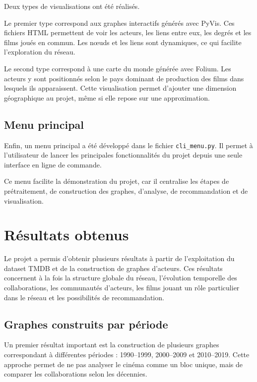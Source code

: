 \documentclass[11pt,a4paper,oneside,openany]{report}
\begin{document}
Deux types de visualisations ont été réalisés.

Le premier type correspond aux graphes interactifs générés avec PyVis. Ces fichiers HTML permettent de voir les acteurs, les liens entre eux, les degrés et les films joués en commun. Les nœuds et les liens sont dynamiques, ce qui facilite l’exploration du réseau.

Le second type correspond à une carte du monde générée avec Folium. Les acteurs y sont positionnés selon le pays dominant de production des films dans lesquels ils apparaissent. Cette visualisation permet d’ajouter une dimension géographique au projet, même si elle repose sur une approximation.

\section{Menu principal}

Enfin, un menu principal a été développé dans le fichier \texttt{cli\_menu.py}. Il permet à l’utilisateur de lancer les principales fonctionnalités du projet depuis une seule interface en ligne de commande.

Ce menu facilite la démonstration du projet, car il centralise les étapes de prétraitement, de construction des graphes, d’analyse, de recommandation et de visualisation.

\chapter{Résultats obtenus}

Le projet a permis d’obtenir plusieurs résultats à partir de l’exploitation du dataset TMDB et de la construction de graphes d’acteurs. Ces résultats concernent à la fois la structure globale du réseau, l’évolution temporelle des collaborations, les communautés d’acteurs, les films jouant un rôle particulier dans le réseau et les possibilités de recommandation.

\section{Graphes construits par période}

Un premier résultat important est la construction de plusieurs graphes correspondant à différentes périodes : 1990--1999, 2000--2009 et 2010--2019. Cette approche permet de ne pas analyser le cinéma comme un bloc unique, mais de comparer les collaborations selon les décennies.
\end{document}

